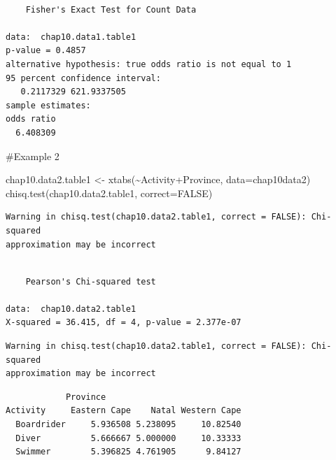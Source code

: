 \documentclass[
  letterpaper,
  DIV=11,
  numbers=noendperiod]{scrartcl}
\newenvironment{Shaded}{\begin{snugshade}}{\end{snugshade}}
\newcommand{\AttributeTok}[1]{\textcolor[rgb]{0.40,0.45,0.13}{#1}}
\newcommand{\ConstantTok}[1]{\textcolor[rgb]{0.56,0.35,0.01}{#1}}
\newcommand{\FunctionTok}[1]{\textcolor[rgb]{0.28,0.35,0.67}{#1}}
\newcommand{\NormalTok}[1]{\textcolor[rgb]{0.00,0.23,0.31}{#1}}
\newcommand{\OtherTok}[1]{\textcolor[rgb]{0.00,0.23,0.31}{#1}}
\newcommand{\SpecialCharTok}[1]{\textcolor[rgb]{0.37,0.37,0.37}{#1}}
\begin{document}
\begin{verbatim}

    Fisher's Exact Test for Count Data

data:  chap10.data1.table1
p-value = 0.4857
alternative hypothesis: true odds ratio is not equal to 1
95 percent confidence interval:
   0.2117329 621.9337505
sample estimates:
odds ratio 
  6.408309 
\end{verbatim}

\#Example 2

\begin{Shaded}
\begin{Highlighting}[]
\NormalTok{chap10.data2.table1 }\OtherTok{\textless{}{-}} \FunctionTok{xtabs}\NormalTok{(}\SpecialCharTok{\textasciitilde{}}\NormalTok{Activity}\SpecialCharTok{+}\NormalTok{Province, }\AttributeTok{data=}\NormalTok{chap10data2)}
\FunctionTok{chisq.test}\NormalTok{(chap10.data2.table1, }\AttributeTok{correct=}\ConstantTok{FALSE}\NormalTok{)}
\end{Highlighting}
\end{Shaded}

\begin{verbatim}
Warning in chisq.test(chap10.data2.table1, correct = FALSE): Chi-squared
approximation may be incorrect
\end{verbatim}

\begin{verbatim}

    Pearson's Chi-squared test

data:  chap10.data2.table1
X-squared = 36.415, df = 4, p-value = 2.377e-07
\end{verbatim}

\begin{Shaded}
\end{Shaded}

\begin{verbatim}
Warning in chisq.test(chap10.data2.table1, correct = FALSE): Chi-squared
approximation may be incorrect
\end{verbatim}

\begin{verbatim}
            Province
Activity     Eastern Cape    Natal Western Cape
  Boardrider     5.936508 5.238095     10.82540
  Diver          5.666667 5.000000     10.33333
  Swimmer        5.396825 4.761905      9.84127
\end{verbatim}
\end{document}
